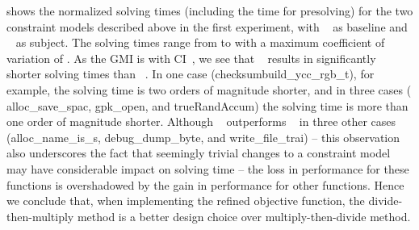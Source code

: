  shows the normalized solving times
(including the time for presolving) for the two \glspl{constraint model}
described above in the first experiment, with ~\modelA{} as \gls{baseline} and ~\modelB{}
as \gls{subject}.
%
The solving times range from
\printMinSolvingTime{
  \NewOpCostFunVsOldPrePlusSolvingTimeSpeedupPrePlusSolvingTimeAvgMin,
  \NewOpCostFunVsOldPrePlusSolvingTimeSpeedupBaselinePrePlusSolvingTimeAvgMin
} to
\printMaxSolvingTime{
  \NewOpCostFunVsOldPrePlusSolvingTimeSpeedupPrePlusSolvingTimeAvgMax,
  \NewOpCostFunVsOldPrePlusSolvingTimeSpeedupBaselinePrePlusSolvingTimeAvgMax
} with a maximum coefficient of variation of
\numMaxOf{
  \NewOpCostFunVsOldPrePlusSolvingTimeSpeedupPrePlusSolvingTimeCvMax,
  \NewOpCostFunVsOldPrePlusSolvingTimeSpeedupBaselinePrePlusSolvingTimeCvMax
}.
%
As the \gls{GMI} is \printGMI{%
  \NewOpCostFunVsOldPrePlusSolvingTimeSpeedupPrePlusSolvingTimeRegularSpeedupGmean%
} with \gls{CI}~\printGMICI{%
  \NewOpCostFunVsOldPrePlusSolvingTimeSpeedupPrePlusSolvingTimeRegularSpeedupCiMin%
}{%
  \NewOpCostFunVsOldPrePlusSolvingTimeSpeedupPrePlusSolvingTimeRegularSpeedupCiMax%
}, we see that ~\modelB{} results in significantly
shorter solving times than ~\modelA.
%
In one case (checksum{\codeFont build\_ycc\_rgb\_t}), for example, the solving
time is two orders of magnitude shorter, and in three cases ({\codeFont
  alloc\_save\_spac}, {\codeFont gpk\_open}, and {\codeFont trueRandAccum}) the
solving time is more than one order of magnitude shorter.
%
Although ~\modelA{} outperforms ~\modelB{} in three other cases ({\codeFont alloc\_name\_is\_s},
{\codeFont debug\_dump\_byte}, and {\codeFont write\_file\_trai}) -- this
observation also underscores the fact that seemingly trivial changes to a
\gls{constraint model} may have considerable impact on solving time -- the loss
in performance for these \glspl{function} is overshadowed by the gain in
performance for other \glspl{function}.
%
Hence we conclude that, when implementing the refined \gls{objective function},
the \gls{divide-then-multiply method} is a better design choice over
\gls{multiply-then-divide method}.

